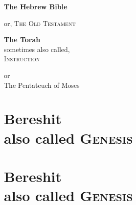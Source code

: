 \documentclass[a4paper,11pt,doublespaced]{report}
\begin{document}
\begin{titlepage}
    \begin{center}
        \vspace*{1cm}
 
        {\Huge  \textbf{The Hebrew Bible}}
 
        \vspace{0.5cm}
        {or, \textsc{The Old Testament}}
        
                   
        \vspace{1.5cm}
        
        {\textbf{The Torah}\\
        sometimes also called,\\
        \textsc{Instruction}}

        \vspace{1.5cm}

        \vspace{0.5cm}
        {or\\
        The Pentateuch of Moses}

        \vspace{0.5cm}

        \vfill
    \end{center}
 \end{titlepage}

\tableofcontents

\part[Bereshit]{Bereshit\\[\bigskipamount]
    \large also called \textsc{Genesis}}

\part[Bereshit]{Bereshit\\[\bigskipamount]
    \large also called \textsc{Genesis}}

% 
% 
% 
% 
% 
% 
% 
% 
% 
\end{document}

